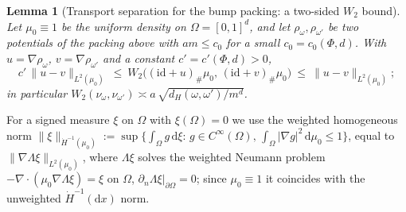 \documentclass[11pt]{article}
\newtheorem{lemma}{Lemma}
\theoremstyle{definition}
\theoremstyle{remark}
\begin{document}
\begin{lemma}[Transport separation for the bump packing: a two-sided $W_2$ bound]\label{lem:sep}
Let $\mu_0\equiv1$ be the uniform density on $\Omega=[0,1]^d$, and let $\rho_\omega,\rho_{\omega'}$ be
two potentials of the packing above with $am\le c_0$ for a small $c_0=c_0(\Phi,d)$. With
$u=\nabla\rho_\omega$, $v=\nabla\rho_{\omega'}$ and a constant $c'=c'(\Phi,d)>0$,
\[
  c'\,\|u-v\|_{L^2(\mu_0)}\ \le\ W_2\big((\mathrm{id}+u)_\#\mu_0,\,(\mathrm{id}+v)_\#\mu_0\big)\ \le\ \|u-v\|_{L^2(\mu_0)};
\]
in particular $W_2(\nu_\omega,\nu_{\omega'})\asymp a\,\sqrt{d_H(\omega,\omega')/m^d}$.
\end{lemma}
\noindent For a signed measure $\xi$ on $\Omega$ with $\xi(\Omega)=0$ we use the weighted homogeneous
norm $\|\xi\|_{\dot H^{-1}(\mu_0)}:=\sup\{\int_\Omega g\,\mathrm d\xi:\,g\in C^\infty(\Omega),\,\int_\Omega|\nabla g|^2\,\mathrm d\mu_0\le1\}$,
equal to $\|\nabla\Lambda\xi\|_{L^2(\mu_0)}$, where $\Lambda\xi$ solves the weighted Neumann problem
$-\nabla\!\cdot(\mu_0\nabla\Lambda\xi)=\xi$ on $\Omega$, $\partial_n\Lambda\xi|_{\partial\Omega}=0$;
since $\mu_0\equiv1$ it coincides with the unweighted $\dot H^{-1}(\mathrm dx)$ norm.
\end{document}
